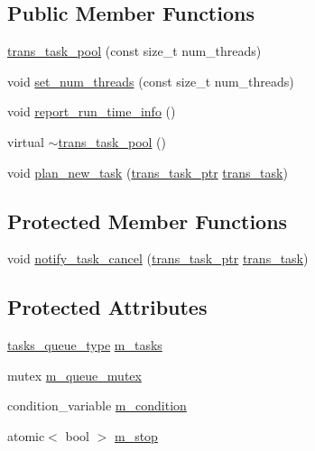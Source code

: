 \subsection*{Public Member Functions}
\begin{DoxyCompactItemize}
\item 
\hyperlink{classuva_1_1smt_1_1bpbd_1_1server_1_1trans__task__pool_a8495bbbd05167cfe47d0c2638e9d84ac}{trans\+\_\+task\+\_\+pool} (const size\+\_\+t num\+\_\+threads)
\item 
void \hyperlink{classuva_1_1smt_1_1bpbd_1_1server_1_1trans__task__pool_a8da55553e04554165e4c8d983255ef63}{set\+\_\+num\+\_\+threads} (const size\+\_\+t num\+\_\+threads)
\item 
void \hyperlink{classuva_1_1smt_1_1bpbd_1_1server_1_1trans__task__pool_a1c200441061258c47116296c2181837b}{report\+\_\+run\+\_\+time\+\_\+info} ()
\item 
virtual \hyperlink{classuva_1_1smt_1_1bpbd_1_1server_1_1trans__task__pool_a9ad96e6069c01179f14bd0333029234d}{$\sim$trans\+\_\+task\+\_\+pool} ()
\item 
void \hyperlink{classuva_1_1smt_1_1bpbd_1_1server_1_1trans__task__pool_a03e800374f485e13ef8c4c7e39d8db39}{plan\+\_\+new\+\_\+task} (\hyperlink{namespaceuva_1_1smt_1_1bpbd_1_1server_a4dea4bb1185fe5d148be18ad12fea74a}{trans\+\_\+task\+\_\+ptr} \hyperlink{classuva_1_1smt_1_1bpbd_1_1server_1_1trans__task}{trans\+\_\+task})
\end{DoxyCompactItemize}
\subsection*{Protected Member Functions}
\begin{DoxyCompactItemize}
\item 
void \hyperlink{classuva_1_1smt_1_1bpbd_1_1server_1_1trans__task__pool_a79d4c7977c98b55679b00ae18b6158f1}{notify\+\_\+task\+\_\+cancel} (\hyperlink{namespaceuva_1_1smt_1_1bpbd_1_1server_a4dea4bb1185fe5d148be18ad12fea74a}{trans\+\_\+task\+\_\+ptr} \hyperlink{classuva_1_1smt_1_1bpbd_1_1server_1_1trans__task}{trans\+\_\+task})
\end{DoxyCompactItemize}
\subsection*{Protected Attributes}
\begin{DoxyCompactItemize}
\item 
\hyperlink{classuva_1_1smt_1_1bpbd_1_1server_1_1trans__task__pool_a854d6c3235224e2b976ab92b450461eb}{tasks\+\_\+queue\+\_\+type} \hyperlink{classuva_1_1smt_1_1bpbd_1_1server_1_1trans__task__pool_a5d7745f1dc249cfb29fa382fbb66d25f}{m\+\_\+tasks}
\item 
mutex \hyperlink{classuva_1_1smt_1_1bpbd_1_1server_1_1trans__task__pool_af8a9fdb7cfbd07cec5c572a7efe58810}{m\+\_\+queue\+\_\+mutex}
\item 
condition\+\_\+variable \hyperlink{classuva_1_1smt_1_1bpbd_1_1server_1_1trans__task__pool_a825b14e27717f701f7d7f100e2e570dc}{m\+\_\+condition}
\item 
atomic$<$ bool $>$ \hyperlink{classuva_1_1smt_1_1bpbd_1_1server_1_1trans__task__pool_a60febff93f48cda3adba96429692660e}{m\+\_\+stop}
\end{DoxyCompactItemize}

